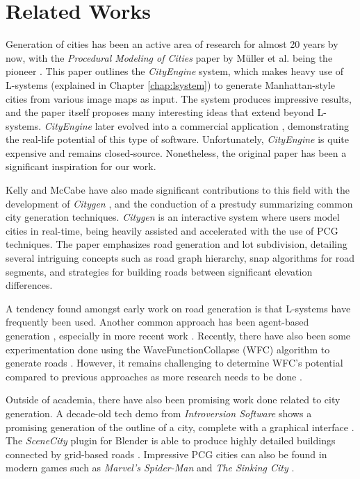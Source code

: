\section{Related Works}

Generation of cities has been an active area of research for almost 20 years by now, with the \textit{Procedural Modeling of Cities} paper by Müller et al. being the pioneer \cite{muller_city_gen}.
This paper outlines the \textit{CityEngine} system, which makes heavy use of L-systems (explained in Chapter \ref{chap:lsystem}) to generate Manhattan-style cities from various image maps as input.
The system produces impressive results, and the paper itself proposes many interesting ideas that extend beyond L-systems.
\textit{CityEngine} later evolved into a commercial application \cite{esri}, demonstrating the real-life potential of this type of software.
Unfortunately, \textit{CityEngine} is quite expensive and remains closed-source.
Nonetheless, the original paper has been a significant inspiration for our work.

Kelly and McCabe have also made significant contributions to this field with the development of \textit{Citygen} \cite{citygen_paper}, and the conduction of a prestudy \cite{citygen_paper_prestudy} summarizing common city generation techniques. 
\textit{Citygen} is an interactive system where users model cities in real-time, being heavily assisted and accelerated with the use of PCG techniques.
The paper emphasizes road generation and lot subdivision, detailing several intriguing concepts such as road graph hierarchy, snap algorithms for road segments, and strategies for building roads between significant elevation differences.

A tendency found amongst early work on road generation is that L-systems have frequently been used.
Another common approach has been agent-based generation \cite{agent_based_roads}, especially in more recent work \cite{tmwhere} \cite{robin}.
Recently, there have also been some experimentation done using the WaveFunctionCollapse (WFC) algorithm \cite{wavefunc} to generate roads \cite{wavefunc_roads}.
However, it remains challenging to determine WFC's potential compared to previous approaches as more research needs to be done \cite[p.50]{wavefunc_roads}.

Outside of academia, there have also been promising work done related to city generation.
A decade-old tech demo from \textit{Introversion Software} shows a promising generation of the outline of a city, complete with a graphical interface \cite{subversion}.
The \textit{SceneCity} plugin for Blender \cite{blender} is able to produce highly detailed buildings connected by grid-based roads \cite{scenecity}.
Impressive PCG cities can also be found in modern games such as \textit{Marvel's Spider-Man} \cite{pcg_spiderman} and \textit{The Sinking City} \cite{pcg_sunken_city}.

